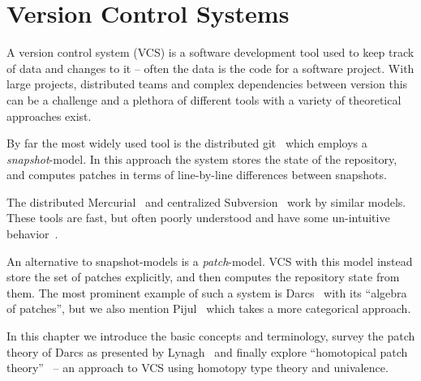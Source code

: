 \chapter{Version Control Systems}

A version control system (VCS) is a software development tool used to keep track
of data and changes to it -- often the data is the code for a software project.
With large projects, distributed teams and complex
dependencies between version this can be a challenge and a plethora of different
tools with a variety of theoretical approaches exist.

By far the most widely used tool is the distributed git~\cite{Git} which employs a
\emph{snapshot}-model. In this approach the system stores the state of the
repository, and computes patches in terms of line-by-line differences between
snapshots.

The distributed Mercurial~\cite{Mercurial} and centralized
Subversion~\cite{Subversion} work by similar models. These tools are fast, but
often poorly understood and have some un-intuitive
behavior~\cite{git-inconsistent, badmerge}.

An alternative to snapshot-models is a \emph{patch}-model. VCS with this model
instead store the set of patches explicitly, and then computes the repository
state from them. The most prominent example of such a system is
Darcs~\cite{Darcs} with its ``algebra of patches'', but we also mention
Pijul~\cite{Pijul} which takes a more categorical approach.

In this chapter we introduce the basic concepts and terminology, survey the
patch theory of Darcs as presented by Lynagh~\cite{Lynagh2006} and finally
explore ``homotopical patch theory''~\cite{Angiuli2016} -- an approach to VCS
using homotopy type theory and univalence.